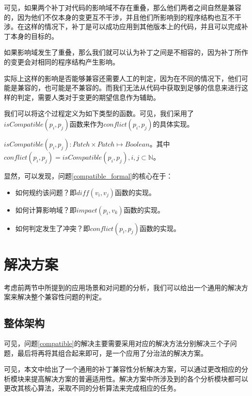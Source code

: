 可见，如果两个补丁对代码的影响域不存在重叠，那么他们两者之间自然是兼容的，因为他们不仅本身的变更互不干涉，并且他们所影响到的程序结构也互不干涉。在这样的情况下，补丁是可以成功应用到其他版本上的代码，并且可以完成补丁本身的目标的。

如果影响域发生了重叠，那么我们就可以认为补丁之间是不相容的，因为补丁所作的变更会对相同的程序结构产生影响。

实际上这样的影响是否能够兼容还需要人工的判定，因为在不同的情况下，他们可能是兼容的，也可能是不兼容的。而我们无法从代码中获取到足够的信息来进行这样的判定，需要人类对于变更的期望信息作为辅助。

我们可以将这个过程定义为如下类型的函数。可见，我们采用了$isCompatible(p_i,p_j)$函数来作为$conflict(p_i,p_j)$的具体实现。

\begin{definition}
	$isCompatible(p_i,p_j) : Patch \times Patch \mapsto Boolean$。其中$conflict(p_i,p_j) = isCompatible(p_i,p_j),i,j \subset \mathbb{N}$。
\end{definition}

显然，可以发现，问题\ref {compatible_formal}的核心在于：
\begin{itemize}
	\item 如何规约该问题？即$diff(v_i,v_j)$函数的实现。
	\item 如何计算影响域？即$impact(p_i,v_k)$函数的实现。
	\item 如何判定发生了冲突？即$conflict(p_i,p_j)$函数的实现。
\end{itemize}

\section{解决方案}

考虑前两节中所提到的应用场景和对问题的分析，我们可以给出一个通用的解决方案来解决整个兼容性问题的判定。

\subsection{整体架构}

可见，问题\ref{compatible}的解决主要需要采用对应的解决方法分别解决三个子问题，最后将再将其组合起来即可，是一个应用了分治法的解决方案。



可见，本文中给出了一个通用的补丁兼容性分析解决方案，可以通过更改相应的分析模块来提高解决方案的普遍适用性。解决方案中所涉及到的各个分析模块都可以更改其核心算法，采取不同的分析算法来完成相应的任务。

